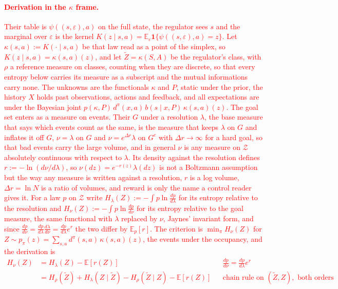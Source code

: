 \documentclass[10pt]{article}
\newcommand{\add}[1]{\textcolor{red}{#1}}
\begin{document}
\paragraph{\add{Derivation in the $\kappa$ frame.}}
\add{Their table is $\psi((s,\varepsilon),a)$ on the full state, the regulator sees $s$ and the marginal over $\varepsilon$ is the kernel $K(z \mid s,a) = \mathbb E_\varepsilon \mathbf 1\{\psi((s,\varepsilon),a) = z\}$.
Let $\kappa(s,a) := K(\cdot \mid s,a)$ be that law read as a point of the simplex, so $K(z \mid s,a) = \kappa(s,a)(z)$, and let $\tilde Z = \kappa(S,A)$ be the regulator's class, with $\rho$ a reference measure on classes, counting when they are discrete, so that every entropy below carries its measure as a subscript and the mutual informations carry none.
The unknowns are the functionals $\kappa$ and $P$, static under the prior, the history $X$ holds past observations, actions and feedback, and all expectations are under the Bayesian joint $p(\kappa,P)\,d^\pi(x,a)\,b(s \mid x,P)\,\kappa(s,a)(z)$.
The goal set enters as a measure on events.
Their $G$ under a resolution $\lambda$, the base measure that says which events count as the same, is the measure that keeps $\lambda$ on $G$ and inflates it off $G$, $\nu = \lambda$ on $G$ and $\nu = e^{\Delta r}\lambda$ on $G^c$ with $\Delta r \to \infty$ for a hard goal, so that bad events carry the large volume, and in general $\nu$ is any measure on $\mathcal Z$ absolutely continuous with respect to $\lambda$.
Its density against the resolution defines $r := -\ln(d\nu/d\lambda)$, so $\nu(dz) = e^{-r(z)}\lambda(dz)$ is not a Boltzmann assumption but the way any measure is written against a resolution, $r$ is a log volume, $\Delta r = \ln N$ is a ratio of volumes, and reward is only the name a control reader gives it.
For a law $p$ on $\mathcal Z$ write $H_\lambda(Z) := -\int p \ln \tfrac{dp}{d\lambda}$ for its entropy relative to the resolution and $H_\nu(Z) := -\int p \ln \tfrac{dp}{d\nu}$ for its entropy relative to the goal measure, the same functional with $\lambda$ replaced by $\nu$, Jaynes' invariant form, and since $\tfrac{dp}{d\nu} = \tfrac{dp}{d\lambda}\tfrac{d\lambda}{d\nu} = \tfrac{dp}{d\lambda} e^{r}$ the two differ by $\mathbb E_p[r]$.
The criterion is $\min_\pi H_\nu(Z)$ for $Z \sim p_\pi(z) = \sum_{s,a} d^\pi(s,a)\,\kappa(s,a)(z)$, the events under the occupancy, and the derivation is
\begin{align*}
  H_\nu(Z) &= H_\lambda(Z) - \mathbb E[r(Z)] && \tfrac{dp}{d\nu} = \tfrac{dp}{d\lambda} e^{r} \\
           &= H_\rho(\tilde Z) + H_\lambda(Z \mid \tilde Z) - H_\rho(\tilde Z \mid Z) - \mathbb E[r(Z)] && \text{chain rule on } (\tilde Z, Z), \text{ both orders} \\

\end{align*}}
\end{document}
